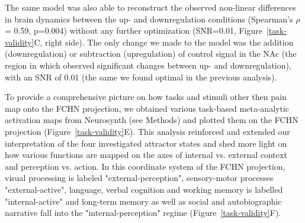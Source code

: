 \documentclass{article}
\begin{document}
The same model was also able to reconstruct the observed non-linear differences in brain dynamics between the up- and downregulation conditions (Spearman's $\rho$ = 0.59, p=0.004) without any further optimization (SNR=0.01,
Figure~\ref{task-validity}C, right side). The only change we made to the model was the addition (downregulation) or
subtraction (upregulation) of control signal in the NAc (the region in which \citep{woo2015distinct} observed significant changes between up- and downregulation), with an SNR of 0.01 (the same we found optimal in the previous analysis).



To provide a comprehensive picture on how tasks and stimuli other then pain map onto the FCHN projection, we obtained various task-based meta-analytic activation maps from Neurosynth (see Methods) and plotted them on the FCHN projection (Figure~\ref{task-validity}E). This analysis reinforced and extended our interpretation of the four investigated attractor states and shed more light on how various functions are mapped on the axes of internal vs. external context and perception vs. action.
In this coordinate system of the FCHN projection, visual processing is labeled "external-perception", sensory-motor processes "external-active", language, verbal cognition and working memory is labelled "internal-active" and long-term memory as well as social and autobiographic narrative fall into the "internal-perception" regime (Figure~\ref{task-validity}F).

\end{document}
